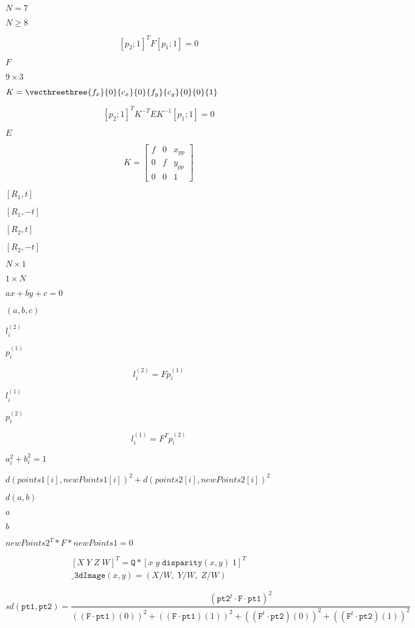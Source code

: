 \documentclass{article}
\begin{document}
$N = 7$
\pagebreak

$N \ge 8$
\pagebreak

\[[p_2; 1]^T F [p_1; 1] = 0\]
\pagebreak

$F$
\pagebreak

$9 \times 3$
\pagebreak

$K = \vecthreethree{f_x}{0}{c_x}{0}{f_y}{c_y}{0}{0}{1}$
\pagebreak

\[[p_2; 1]^T K^{-T} E K^{-1} [p_1; 1] = 0\]
\pagebreak

$E$
\pagebreak

\[K = \begin{bmatrix} f & 0 & x_{pp} \\ 0 & f & y_{pp} \\ 0 & 0 & 1 \end{bmatrix}\]
\pagebreak

$[R_1, t]$
\pagebreak

$[R_1, -t]$
\pagebreak

$[R_2, t]$
\pagebreak

$[R_2, -t]$
\pagebreak

$N \times 1$
\pagebreak

$1 \times N$
\pagebreak

$ax + by + c=0$
\pagebreak

$(a, b, c)$
\pagebreak

$l^{(2)}_i$
\pagebreak

$p^{(1)}_i$
\pagebreak

\[l^{(2)}_i = F p^{(1)}_i\]
\pagebreak

$l^{(1)}_i$
\pagebreak

$p^{(2)}_i$
\pagebreak

\[l^{(1)}_i = F^T p^{(2)}_i\]
\pagebreak

$a_i^2+b_i^2=1$
\pagebreak

$d(points1[i], newPoints1[i])^2 + d(points2[i],newPoints2[i])^2$
\pagebreak

$d(a,b)$
\pagebreak

$a$
\pagebreak

$b$
\pagebreak

$newPoints2^T * F * newPoints1 = 0$
\pagebreak

\[\begin{array}{l} [X \; Y \; Z \; W]^T = \texttt{Q} *[x \; y \; \texttt{disparity} (x,y) \; 1]^T \\ \texttt{\_3dImage} (x,y) = (X/W, \; Y/W, \; Z/W) \end{array}\]
\pagebreak

\[ sd( \texttt{pt1} , \texttt{pt2} )= \frac{(\texttt{pt2}^t \cdot \texttt{F} \cdot \texttt{pt1})^2} {((\texttt{F} \cdot \texttt{pt1})(0))^2 + ((\texttt{F} \cdot \texttt{pt1})(1))^2 + ((\texttt{F}^t \cdot \texttt{pt2})(0))^2 + ((\texttt{F}^t \cdot \texttt{pt2})(1))^2} \]
\pagebreak
\end{document}
